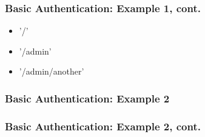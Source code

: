 \documentclass{beamer}
\begin{document}
\begin{frame}[fragile]\frametitle{Basic Authentication: Example 1, cont.} 

  
    
  \begin{itemize}
    \item '/'
    \item '/admin'
    \item '/admin/another'
  \end{itemize}
  
\end{frame}



\begin{frame}[fragile]\frametitle{Basic Authentication: Example 2} 

  
    
\end{frame}


\begin{frame}[fragile]\frametitle{Basic Authentication: Example 2, cont.} 

  
  
  
    
\end{frame}
\end{document}
